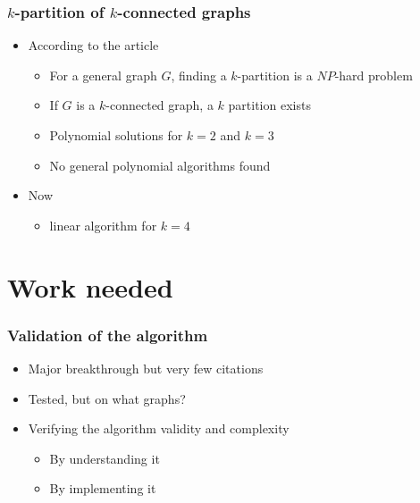 \documentclass[xcolor=dvipsnames]{beamer}
\begin{document}
\begin{frame}
  \frametitle{$k$-partition of $k$-connected graphs}
  \begin{itemize}
  \item According to the article
    \begin{itemize}
    \item For a general graph $G$, finding a $k$-partition is a $NP$-hard
      problem\cite{Dyer1985139}
    \item If $G$ is a $k$-connected graph, a $k$ partition exists\cite{GE78,LL77}
    \item Polynomial solutions for $k = 2$\cite{GE78,LL77} and
      $k = 3$%
    \item No general polynomial algorithms found
    \end{itemize}
  \item Now
    \begin{itemize}
    \item linear algorithm for $k = 4$\cite{Nakano1997315}
    \end{itemize}
  \end{itemize}
\end{frame}

\section{Work needed}

\begin{frame}
  \frametitle{Validation of the algorithm}
  \begin{itemize}
  \item Major breakthrough but very few citations
  \item Tested, but on what graphs?
  \item Verifying the algorithm validity and complexity
    \begin{itemize}
    \item By understanding it
    \item By implementing it
    \end{itemize}
  \end{itemize}
\end{frame}
\end{document}
